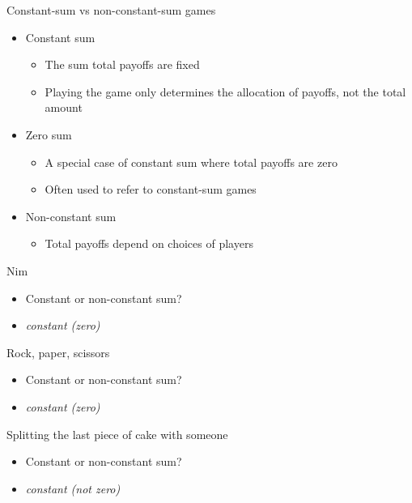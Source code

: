 \documentclass[10pt]{beamer}
\begin{document}
\begin{frame}[label={sec:org20d997c}]{}
\alert{Constant-sum vs non-constant-sum games}
\begin{itemize}
\item Constant sum
\begin{itemize}
\item The sum total payoffs are fixed
\item Playing the game only determines the allocation of payoffs, not the total amount
\end{itemize}
\item Zero sum
\begin{itemize}
\item A special case of constant sum where total payoffs are zero
\item Often used to refer to constant-sum games
\end{itemize}
\item Non-constant sum
\begin{itemize}
\item Total payoffs depend on choices of players
\end{itemize}
\end{itemize}
\end{frame}

\begin{frame}[label={sec:orge6647b1}]{}
\alert{Nim}
\begin{itemize}
\item Constant or non-constant sum?
\end{itemize}
\begin{itemize}
\item \emph{constant (zero)}
\end{itemize}
\end{frame}

\begin{frame}[label={sec:org4d81059}]{}
\alert{Rock, paper, scissors}
\begin{itemize}
\item Constant or non-constant sum?
\end{itemize}
\begin{itemize}
\item \emph{constant (zero)}
\end{itemize}
\end{frame}

\begin{frame}[label={sec:org347e7bd}]{}
\alert{Splitting the last piece of cake with someone}
\begin{itemize}
\item Constant or non-constant sum?
\end{itemize}
\begin{itemize}
\item \emph{constant (not zero)}
\end{itemize}
\end{frame}
\end{document}
